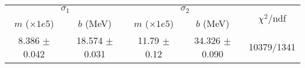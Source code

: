\begin{tabular}{cc|cc||c}
\multicolumn{2}{c|}{$\sigma_1$} & \multicolumn{2}{|c}{$\sigma_2$} & \multirow{2}{*}{$\chi^2/$ndf} \\
$m$ ($\times1e5$) & $b$ (MeV) & $m$ ($\times1e5$) & $b$ (MeV) & \\
\hline
8.386 $\pm$ 0.042 & 18.574 $\pm$ 0.031 & 11.79 $\pm$ 0.12 & 34.326 $\pm$ 0.090 & 10379/1341\\
\end{tabular}
